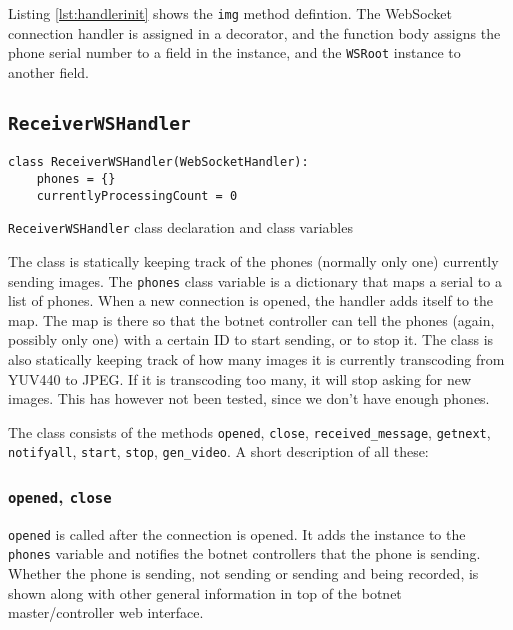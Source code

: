 \documentclass[a4paper]{report}
\newcommand{\classname}[1]{\texttt{#1}}
\newcommand{\methodname}[1]{\texttt{#1}}
\newcommand{\variable}[1]{\texttt{#1}}
\begin{document}
Listing \ref{lst:handlerinit} shows the \methodname{img} method defintion. The WebSocket connection handler is assigned in a decorator, and the function body assigns the phone serial number to a field in the instance, and the \classname{WSRoot} instance to another field.

\subsection{\classname{ReceiverWSHandler}}

\begin{listing}[H]
\begin{verbatim}
class ReceiverWSHandler(WebSocketHandler):
    phones = {}
    currentlyProcessingCount = 0
\end{verbatim}
\caption{\classname{ReceiverWSHandler} class declaration and class variables}
\label{lst:rwshdecl}
\end{listing}

The class is statically keeping track of the phones (normally only one) currently sending images. The \variable{phones} class variable is a dictionary that maps a serial to a list of phones. When a new connection is opened, the handler adds itself to the map. The map is there so that the botnet controller can tell the phones (again, possibly only one) with a certain ID to start sending, or to stop it. The class is also statically keeping track of how many images it is currently transcoding from YUV440 to JPEG. If it is transcoding too many, it will stop asking for new images. This has however not been tested, since we don't have enough phones.

The class consists of the methods \methodname{opened}, \methodname{close}, \methodname{received\_message}, \methodname{getnext}, \methodname{notifyall}, \methodname{start}, \methodname{stop}, \methodname{gen\_video}. A short description of all these:

\subsubsection{\methodname{opened}, \methodname{close}}
\methodname{opened} is called after the connection is opened. It adds the instance to the \variable{phones} variable and notifies the botnet controllers that the phone is sending. Whether the phone is sending, not sending or sending and being recorded, is shown along with other general information in top of the botnet master/controller web interface.
\end{document}
